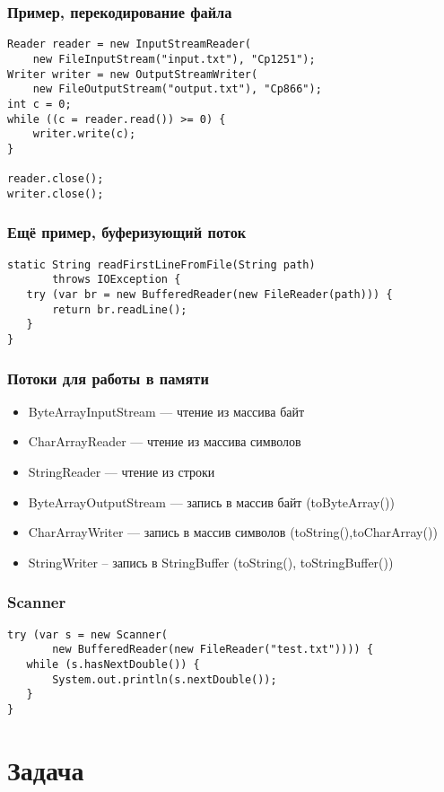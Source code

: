 \documentclass[xetex,mathserif,serif]{beamer}
\begin{document}
	\begin{frame}[fragile]
		\frametitle{Пример, перекодирование файла}
		\begin{verbatim}
Reader reader = new InputStreamReader(
    new FileInputStream("input.txt"), "Cp1251");
Writer writer = new OutputStreamWriter(
    new FileOutputStream("output.txt"), "Cp866");
int c = 0;
while ((c = reader.read()) >= 0) {
    writer.write(c);
}

reader.close();
writer.close();
		\end{verbatim}
	\end{frame}

	\begin{frame}[fragile]
		\frametitle{Ещё пример, буферизующий поток}
		\begin{verbatim}
static String readFirstLineFromFile(String path)
       throws IOException {
   try (var br = new BufferedReader(new FileReader(path))) {
       return br.readLine();
   }
}
		\end{verbatim}
	\end{frame}

	\begin{frame}
		\frametitle{Потоки для работы в памяти}
		\begin{itemize}
			\item ByteArrayInputStream --- чтение из массива байт
			\item CharArrayReader --- чтение из массива символов
			\item StringReader --- чтение из строки
			\item ByteArrayOutputStream --- запись в массив байт (toByteArray())
			\item CharArrayWriter --- запись в массив символов (toString(),toCharArray())
			\item StringWriter – запись в StringBuffer (toString(), toStringBuffer())
		\end{itemize}
	\end{frame}

	\begin{frame}[fragile]
		\frametitle{Scanner}
		\begin{verbatim}
try (var s = new Scanner(
       new BufferedReader(new FileReader("test.txt")))) {
   while (s.hasNextDouble()) {
       System.out.println(s.nextDouble());
   }
}
		\end{verbatim}
	\end{frame}

	\section{Задача}
\end{document}
